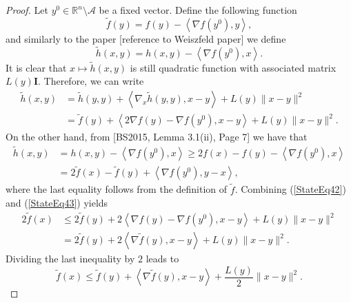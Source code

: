 \documentclass[11pt]{article}
\numberwithin{equation}{section}
\begin{document}
\begin{proof}
Let $y^0 \in \mathbb{R}^n \setminus \mathcal{A}$ be a fixed vector. Define the following function
\begin{equation*}
	\widetilde{f}(y) = f(y) - \left\langle \nabla f(y^0), y \right\rangle ,
\end{equation*}
and similarly to the paper [reference to Weiszfeld paper] we define
 \begin{equation*}
	\widetilde{h}(x,y) = h(x,y) - \left\langle \nabla f(y^0), x \right\rangle .
\end{equation*}
It is clear that $x \mapsto \widetilde{h}(x,y)$ is still quadratic function with associated matrix $L(y)\mathbf{I}$. Therefore, we can write
\begin{equation}
\begin{aligned}
	\widetilde{h}(x,y) &= \widetilde{h}(y,y) + \left\langle \nabla_x \widetilde{h}(y,y), x-y \right\rangle + L(y) \|x-y\|^2 \\
	&= \widetilde{f}(y) + \left\langle 2\nabla f(y) - \nabla f(y^0), x-y \right\rangle + L(y) \|x-y\|^2.	\label{StateEq42}
\end{aligned}
\end{equation}
On the other hand, from [BS2015, Lemma 3.1(ii), Page 7] we have that
\begin{equation}
\begin{aligned}
	\widetilde{h}(x,y) &= h(x,y) - \left\langle	\nabla f(y^0),x \right\rangle \geq 2f(x) - f(y) - \left\langle \nabla f(y^0),x \right\rangle \\
	&= 2 \widetilde{f}(x) - \widetilde{f}(y) + \left\langle \nabla f(y^0), y-x \right\rangle, \label{StateEq43}
\end{aligned}
\end{equation}
where the last equality follows from the definition of $\widetilde{f}$. Combining (\ref{StateEq42}) and (\ref{StateEq43}) yields
\begin{equation*}
\begin{aligned}
	2\widetilde{f}(x) &\leq 2\widetilde{f}(y) + 2 \left\langle \nabla f(y) - \nabla f(y^0), x-y \right\rangle + L(y) \|x-y\|^2 \\
	&= 2\widetilde{f}(y) + 2 \left\langle \nabla \widetilde{f}(y), x-y \right\rangle + L(y) \|x-y\|^2.
\end{aligned}
\end{equation*}
Dividing the last inequality by $2$ leads to
\begin{equation}
	\widetilde{f}(x) \leq \widetilde{f}(y) + \left\langle \nabla \widetilde{f}(y), x-y \right\rangle + \frac{L(y)}{2} \|x-y\|^2. \label{StateEq44}

\end{equation}
\end{proof}
\end{document}
